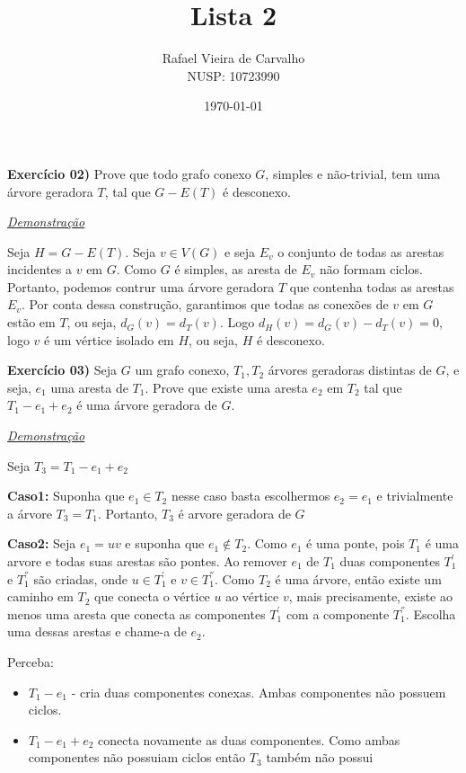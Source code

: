 \documentclass[12pt, a4paper]{article}
\title{Lista 2}
\author{Rafael Vieira de Carvalho \\ NUSP: 10723990}
\date{\today}
\begin{document}
\maketitle

\textbf{Exercício 02)} Prove que todo grafo conexo $G$, simples e não-trivial, tem uma árvore
  geradora $T$, tal que $G-E(T)$ é desconexo.

  \vspace{0.5cm}
  \textit{\underline{Demonstração}}

    Seja $H = G - E(T)$. Seja $v \in V(G)$ e seja $E_v$ o conjunto de todas as
    arestas incidentes a $v$ em $G$. Como $G$ é simples, as aresta de $E_v$
    não formam ciclos. Portanto, podemos contrur uma árvore geradora $T$ que
    contenha todas as arestas $E_v$. Por conta dessa construção, garantimos
    que todas as conexões de $v$ em $G$ estão em $T$, ou seja, $d_G(v) = d_T(v)$.
    Logo $d_H(v) = d_G(v) - d_T(v) = 0$, logo $v$ é um vértice isolado em $H$, 
    ou seja, $H$ é desconexo.
  \newpage

\textbf{Exercício 03)} Seja $G$ um grafo conexo, $T_{1}, T_{2}$ árvores geradoras distintas de $G$, e
  seja, $e_{1}$ uma aresta de $T_{1}$.
  Prove que existe uma aresta $e_{2}$ em $T_{2}$ tal que $T_{1} - e_{1} +
  e_{2}$ é uma árvore geradora de $G$.

  \vspace{0.5cm}
  \textit{\underline{Demonstração}}
    
  Seja $T_3 = T_1 -e_1 + e_2$
  
  \textbf{Caso1:} Suponha que $e_1 \in T_2$ nesse caso basta escolhermos
  $e_2 = e_1$ e trivialmente a árvore $T_3 = T_1$. Portanto, $T_3$ é arvore
  geradora de $G$

  \textbf{Caso2:} Seja $e_1 = uv$ e suponha que $e_1 \notin T_2$. 
  Como $e_1$ é uma ponte, pois $T_1$ é uma arvore e todas suas arestas
  são pontes. Ao remover $e_1$ de $T_1$ duas componentes $T_1^{'}$ e 
  $T_1^{''}$ são criadas, onde $u \in T_1^{'}$ e $v \in T_1^{''}$.
  Como $T_2$ é uma árvore, então existe um caminho em $T_2$ que conecta
  o vértice $u$ ao vértice $v$, mais precisamente, existe ao menos uma aresta
  que conecta as componentes $T_1^{'}$ com a componente $T_1^{''}$.
  Escolha uma dessas arestas e chame-a de $e_2$.

  Perceba:
  \begin{itemize}
    \item $T_1 - e_1$ - cria duas componentes conexas. Ambas componentes
não possuem ciclos.
    \item $T_1 - e_1 + e_2$ conecta novamente as duas componentes. Como
ambas componentes não possuiam ciclos então $T_3$ também não possui 
  \end{itemize}
\end{document}

